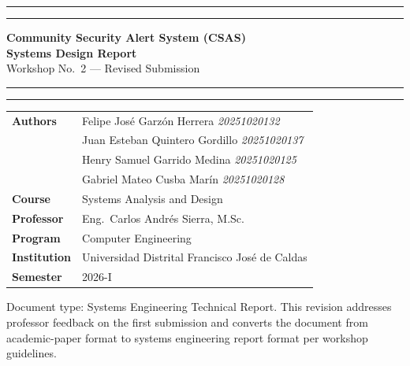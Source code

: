 \documentclass[12pt,a4paper]{article}
\begin{document}
\begin{titlepage}
\centering
\vspace*{1.5cm}
{\color{udblue}\rule{\linewidth}{1.5pt}}\vspace{6pt}
{\color{udgold}\rule{\linewidth}{4pt}}\vspace{16pt}

{\LARGE\bfseries\color{udblue}
Community Security Alert System (CSAS)}\\\vspace{8pt}
{\large\bfseries Systems Design Report}\\\vspace{4pt}
{\large Workshop No.\ 2 --- Revised Submission}\\\vspace{16pt}

{\color{udgold}\rule{\linewidth}{4pt}}\vspace{6pt}
{\color{udblue}\rule{\linewidth}{1.5pt}}\vspace{24pt}

\begin{tabular}{ll}
\textbf{Authors} & Felipe José Garzón Herrera \hfill \textit{20251020132}\\
                 & Juan Esteban Quintero Gordillo \hfill \textit{20251020137}\\
                 & Henry Samuel Garrido Medina \hfill \textit{20251020125}\\
                 & Gabriel Mateo Cusba Marín \hfill \textit{20251020128}\\[6pt]
\textbf{Course}  & Systems Analysis and Design\\
\textbf{Professor} & Eng.\ Carlos Andrés Sierra, M.Sc.\\
\textbf{Program} & Computer Engineering\\
\textbf{Institution} & Universidad Distrital Francisco José de Caldas\\
\textbf{Semester} & 2026-I\\
\end{tabular}

\vfill
{\small\color{gray}
Document type: Systems Engineering Technical Report.
This revision addresses professor feedback on the first submission
and converts the document from academic-paper format to systems
engineering report format per workshop guidelines.}
\end{titlepage}

\tableofcontents
\newpage
\end{document}
